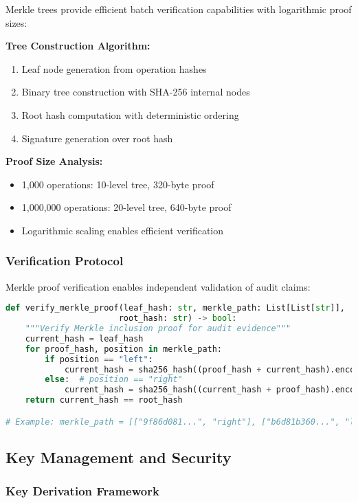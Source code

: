 \documentclass[12pt,a4paper]{article}
\begin{document}
Merkle trees provide efficient batch verification capabilities with logarithmic proof sizes:

\textbf{Tree Construction Algorithm:}
\begin{enumerate}
\item Leaf node generation from operation hashes
\item Binary tree construction with SHA-256 internal nodes
\item Root hash computation with deterministic ordering
\item Signature generation over root hash
\end{enumerate}

\textbf{Proof Size Analysis:}
\begin{itemize}
\item 1,000 operations: 10-level tree, 320-byte proof
\item 1,000,000 operations: 20-level tree, 640-byte proof
\item Logarithmic scaling enables efficient verification
\end{itemize}

\subsubsection{Verification Protocol}

Merkle proof verification enables independent validation of audit claims:

\begin{lstlisting}[language=Python, caption=Merkle Proof Verification]
def verify_merkle_proof(leaf_hash: str, merkle_path: List[List[str]], 
                       root_hash: str) -> bool:
    """Verify Merkle inclusion proof for audit evidence"""
    current_hash = leaf_hash
    for proof_hash, position in merkle_path:
        if position == "left":
            current_hash = sha256_hash((proof_hash + current_hash).encode())
        else:  # position == "right"
            current_hash = sha256_hash((current_hash + proof_hash).encode())
    return current_hash == root_hash

# Example: merkle_path = [["9f86d081...", "right"], ["b6d81b360...", "left"]]
\end{lstlisting}

\subsection{Key Management and Security}

\subsubsection{Key Derivation Framework}
\end{document}
